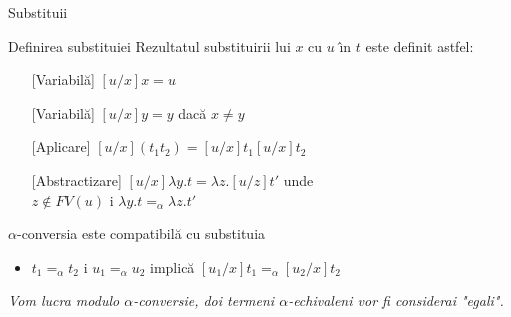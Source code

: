 \documentclass[xcolor=pdftex,romanian,colorlinks]{beamer}
\begin{document}
\begin{frame}[fragile]{ Substitu\ts ii}
\vspace*{0.3cm}

\begin{block}{Definirea substitu\ts iei}
 Rezultatul substituirii lui $x$ cu $u$ \^{\i}n $t$ este definit astfel:

\begin{itemize}
\item[][Variabil\u a] $[u/x]x = u$
\item[][Variabil\u a] $[u/x]y= y$ dac\u a $x\neq y$
\item[][Aplicare] $[u/x](t_1t_2)= [u/x]t_1[u/x]t_2$
\item[][Abstractizare] $[u/x]\lambda y.t=\lambda z. [u/z] t'$ unde\\
\hspace*{3cm} $z\not\in FV(u)$ \sh i 
$\lambda y. t=_\alpha \lambda z.t'$
\end{itemize}
\end{block}

\begin{block}{$\alpha$-conversia este compatibil\u a cu substitu\ts ia}
\begin{itemize}
\item $t_1=_\alpha t_2$ \sh i $u_1=_\alpha u_2$ implic\u a 
$[u_1/x]t_1=_\alpha [u_2/x] t_2$
\end{itemize}
\end{block}
\medskip

{\it Vom lucra modulo $\alpha$-conversie, doi termeni $\alpha$-echivalen\ts i vor fi considera\ts i "egali".}
\end{frame}
\end{document}
